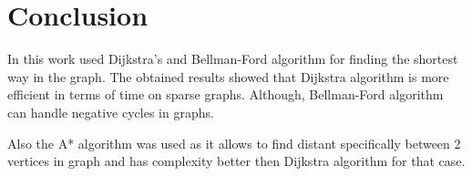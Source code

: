 \section*{Conclusion}

In this work used Dijkstra's and Bellman-Ford algorithm for finding the shortest way in the graph. The obtained results showed that 
Dijkstra algorithm is more efficient in terms of time on sparse graphs. Although, Bellman-Ford algorithm can handle negative cycles in graphs.

Also the A* algorithm was used as it allows to find distant specifically between 2 vertices in graph and has complexity better then Dijkstra algorithm for that case.